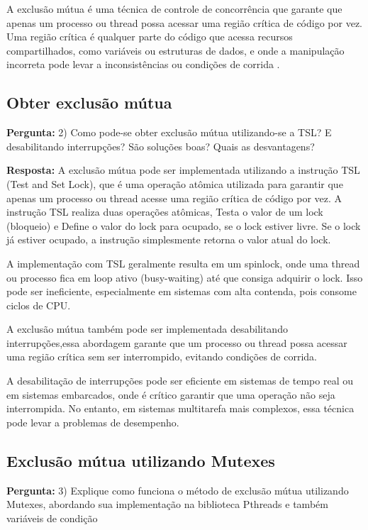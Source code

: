 \documentclass{article}
\begin{document}
A exclusão mútua é uma técnica de controle de concorrência que garante que apenas um processo ou thread possa acessar uma região crítica de código por vez. Uma região crítica é qualquer parte do código que acessa recursos compartilhados, como variáveis ou estruturas de dados, e onde a manipulação incorreta pode levar a inconsistências ou condições de corrida \cite{tanenbaum2021,embarcados2023}.

\subsection{Obter exclusão mútua}
\textbf{Pergunta:} 2) Como pode-se obter exclusão mútua utilizando-se a TSL? E desabilitando interrupções? São soluções boas? Quais as desvantagens?\newline

\textbf{Resposta:} A exclusão mútua pode ser implementada utilizando a instrução TSL (Test and Set Lock), que é uma operação atômica utilizada para garantir que apenas um processo ou thread acesse uma região crítica de código por vez.
A instrução TSL realiza duas operações atômicas, Testa o valor de um lock (bloqueio) e Define o valor do lock para ocupado, se o lock estiver livre. Se o lock já estiver ocupado, a instrução simplesmente retorna o valor atual do lock.

A implementação com TSL geralmente resulta em um spinlock, onde uma thread ou processo fica em loop ativo (busy-waiting) até que consiga adquirir o lock. Isso pode ser ineficiente, especialmente em sistemas com alta contenda, pois consome ciclos de CPU.

A exclusão mútua também pode ser implementada desabilitando interrupções,essa abordagem garante que um processo ou thread possa acessar uma região crítica sem ser interrompido, evitando condições de corrida.

A desabilitação de interrupções pode ser eficiente em sistemas de tempo real ou em sistemas embarcados, onde é crítico garantir que uma operação não seja interrompida. No entanto, em sistemas multitarefa mais complexos, essa técnica pode levar a problemas de desempenho.

\subsection{Exclusão mútua utilizando Mutexes}
\textbf{Pergunta:} 3) Explique como funciona o método de exclusão mútua utilizando Mutexes, abordando sua implementação na biblioteca Pthreads e também variáveis de condição\newline
\end{document}
